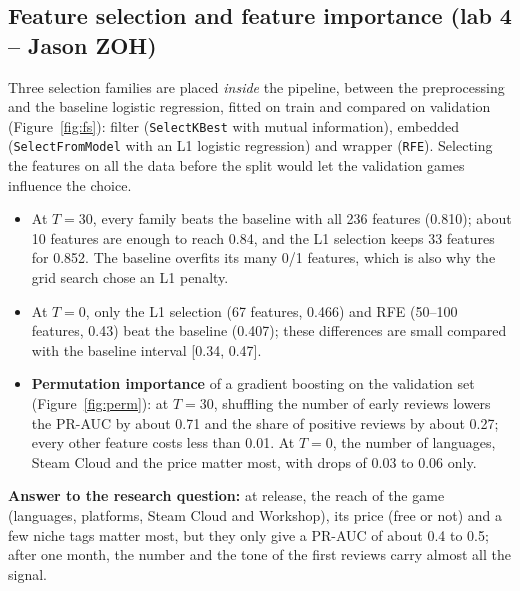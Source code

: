 \documentclass[11pt,a4paper]{article}
\newcommand{\code}[1]{\texttt{#1}}
\begin{document}
\subsection{Feature selection and feature importance (lab 4 -- Jason ZOH)}
Three selection families are placed \emph{inside} the pipeline, between the preprocessing and the baseline
logistic regression, fitted on train and compared on validation (Figure~\ref{fig:fs}): filter
(\code{SelectKBest} with mutual information), embedded (\code{SelectFromModel} with an L1 logistic
regression) and wrapper (\code{RFE}). Selecting the features on all the data before the split would let
the validation games influence the choice.
\begin{itemize}
  \item At $T = 30$, every family beats the baseline with all 236 features (0.810); about 10 features are
        enough to reach 0.84, and the L1 selection keeps 33 features for 0.852. The baseline overfits its
        many 0/1 features, which is also why the grid search chose an L1 penalty.
  \item At $T = 0$, only the L1 selection (67 features, 0.466) and RFE (50--100 features, 0.43) beat the
        baseline (0.407); these differences are small compared with the baseline interval [0.34, 0.47].
  \item \textbf{Permutation importance} of a gradient boosting on the validation set (Figure~\ref{fig:perm}):
        at $T = 30$, shuffling the number of early reviews lowers the PR-AUC by about 0.71 and the share of
        positive reviews by about 0.27; every other feature costs less than 0.01. At $T = 0$, the number of
        languages, Steam Cloud and the price matter most, with drops of 0.03 to 0.06 only.
\end{itemize}
\textbf{Answer to the research question:} at release, the reach of the game (languages, platforms, Steam
Cloud and Workshop), its price (free or not) and a few niche tags matter most, but they only give a PR-AUC of
about 0.4 to 0.5; after one month, the number and the tone of the first reviews carry almost all the signal.
\end{document}
